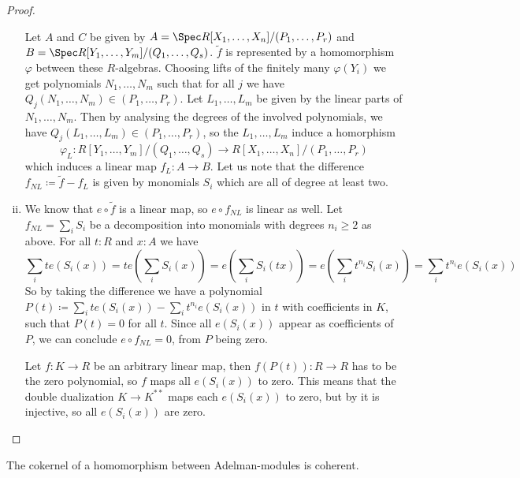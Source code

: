 \begin{proof}
\begin{enumerate}[(i)]
  Let $A$ and $C$ be given by $A=\Spec R[X_1,\dots,X_n]/(P_1,\dots,P_r)$ and $B=\Spec R[Y_1,\dots,Y_m]/(Q_1,\dots,Q_s)$.
  $\tilde{f}$ is represented by a homomorphism $\varphi$ between these $R$-algebras.
  Choosing lifts of the finitely many $\varphi(Y_i)$ we get polynomials $N_1,\dots,N_m$
  such that for all $j$ we have $Q_j(N_1,\dots,N_m)\in (P_1,\dots,P_r)$.
  Let $L_1,\dots,L_m$ be given by the linear parts of $N_1,\dots,N_m$.
  Then by analysing the degrees of the involved polynomials, we have $Q_j(L_1,\dots,L_m)\in (P_1,\dots,P_r)$, so the $L_1,\dots,L_m$ induce a homorphism
  \[
  \varphi_L: R[Y_1,\dots,Y_m]/(Q_1,\dots,Q_s) \to R[X_1,\dots,X_n]/(P_1,\dots,P_r)
  \]
  which induces a linear map $f_L:A\to B$.
  Let us note that the difference $f_{NL}\coloneq \tilde{f}-f_L$ is given by monomials $S_i$ which are all of degree at least two.
  \item We know that $e\circ \tilde{f}$ is a linear map, so $e\circ f_{NL}$ is linear as well.
  Let $f_{NL}=\sum_i S_i$ be a decomposition into monomials with degrees $n_i\geq 2$ as above.
  For all $t:R$ and $x:A$ we have
  \[
  \sum_i te(S_i(x))=te(\sum_i S_i(x))=e(\sum_i S_i(tx))=e(\sum_i t^{n_i}S_i(x))=\sum_i t^{n_i}e( S_i(x))
  \]
  So by taking the difference we have a polynomial $P(t)\coloneq \sum_i te(S_i(x))-\sum_i t^{n_i}e( S_i(x))$ in $t$ with coefficients in $K$, such that $P(t)=0$ for all $t$.
  Since all $e(S_i(x))$ appear as coefficients of $P$, we can conclude $e\circ f_{NL}=0$, from $P$ being zero.

  Let $f:K\to R$ be an arbitrary linear map, then $f(P(t)):R\to R$ has to be the zero polynomial,
  so $f$ maps all $e(S_i(x))$ to zero.
  This means that the double dualization $K\to K^{\ast\ast}$ maps each $e(S_i(x))$ to zero,
  but by  it is injective, so all $e(S_i(x))$ are zero.
  \end{enumerate}
\end{proof}

\begin{lemma}
  \label{coherent-kernels}
  The cokernel of a homomorphism between Adelman-modules is coherent.  
\end{lemma}

